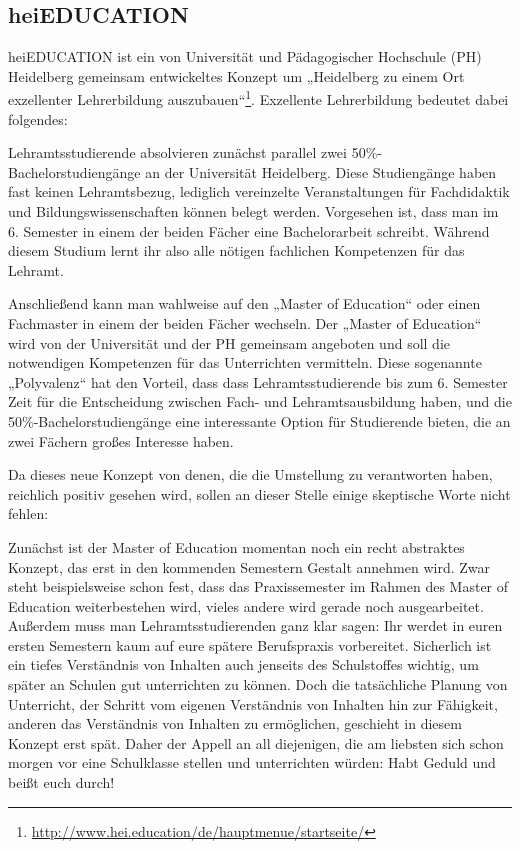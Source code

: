 \subsection{heiEDUCATION}

heiEDUCATION ist ein von Universität und Pädagogischer Hochschule (PH) Heidelberg gemeinsam entwickeltes Konzept um „Heidelberg zu einem Ort exzellenter Lehrerbildung auszubauen“\footnote{\url{http://www.hei.education/de/hauptmenue/startseite/}}. Exzellente Lehrerbildung bedeutet dabei folgendes:

Lehramtsstudierende absolvieren zunächst parallel zwei 50\%-Ba\-che\-lor\-stu\-di\-en\-gän\-ge an der Universität Heidelberg. Diese Studiengänge haben fast keinen Lehramtsbezug, lediglich vereinzelte Veranstaltungen für Fachdidaktik und Bildungswissenschaften können belegt werden. Vorgesehen ist, dass man im 6. Semester in einem der beiden Fächer eine Bachelorarbeit schreibt. Während diesem Studium lernt ihr also alle nötigen fachlichen Kompetenzen für das Lehramt.

Anschließend kann man wahlweise auf den „Master of Education“ oder einen Fachmaster in einem der beiden Fächer wechseln. Der „Master of Education“ wird von der Universität und der PH gemeinsam angeboten und soll die notwendigen Kompetenzen für das Unterrichten vermitteln. Diese sogenannte „Polyvalenz“ hat den Vorteil, dass dass Lehramtsstudierende bis zum 6. Semester Zeit für die Entscheidung zwischen Fach- und Lehramtsausbildung haben, und die 50\%-Bachelorstudiengänge eine interessante Option für Studierende bieten, die an zwei Fächern großes Interesse haben.

Da dieses neue Konzept von denen, die die Umstellung zu verantworten haben, reichlich positiv gesehen wird, sollen an dieser Stelle einige skeptische Worte nicht fehlen:

Zunächst ist der Master of Education momentan noch ein recht abstraktes Konzept, das erst in den kommenden Semestern Gestalt annehmen wird. Zwar steht beispielsweise schon fest, dass das Praxissemester im Rahmen des Master of Education weiterbestehen wird, vieles andere wird gerade noch ausgearbeitet. Außerdem muss man Lehramtsstudierenden ganz klar sagen: Ihr werdet in euren ersten Semestern kaum auf eure spätere Berufspraxis vorbereitet. Sicherlich ist ein tiefes Verständnis von Inhalten auch jenseits des Schulstoffes wichtig, um später an Schulen gut unterrichten zu können. Doch die tatsächliche Planung von Unterricht, der Schritt vom eigenen Verständnis von Inhalten hin zur Fähigkeit, anderen das Verständnis von Inhalten zu ermöglichen, geschieht in diesem Konzept erst spät. Daher der Appell an all diejenigen, die am liebsten sich schon morgen vor eine Schulklasse stellen und unterrichten würden: Habt Geduld und beißt euch durch!


